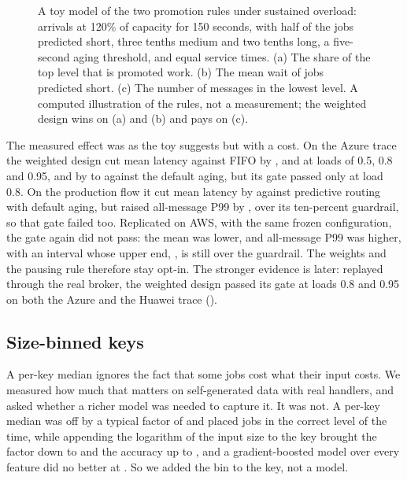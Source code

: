 \begin{figure}[t]
  \centering
  
  \caption{A toy model of the two promotion rules under sustained overload: arrivals at 120\% of capacity for 150 seconds, with half of the jobs predicted short, three tenths medium and two tenths long, a five-second aging threshold, and equal service times. (a) The share of the top level that is promoted work.
  (b) The mean wait of jobs predicted short. (c) The number of messages in the lowest level. A computed illustration of the rules, not a measurement; the weighted design wins on (a) and (b) and pays on (c).}
  \label{fig:aging}
\end{figure}

The measured effect was as the toy suggests but with a cost. On the Azure trace the weighted design cut mean latency against FIFO by \AgingSimHalfAbs{}, \AgingSimEightAbs{} and \AgingSimNinetyFiveAbs{} at loads of 0.5, 0.8 and 0.95, and by \AgingSimVsTodayHalfAbs{} to \AgingSimVsTodayNinetyFiveAbs{} against the default aging, but its gate passed only at load 0.8. On the production flow it cut mean latency by \AgingProdMeanVsPredAbs{}
against predictive routing with default aging, but raised all-message P99 by \AgingProdPNinetyNine{}, over its ten-percent guardrail, so that gate failed too. Replicated on AWS, with the same frozen configuration, the gate again did not pass: the mean was \AgingAwsMeanVsPredAbs{} lower, and all-message P99 was \AgingAwsPNinetyNine{} higher, with an interval whose upper end, \AgingAwsPNinetyNineHigh{}, is still over the guardrail. The weights and the pausing rule therefore stay opt-in. The stronger evidence is later: replayed through the real broker, the weighted design passed its gate at loads 0.8 and 0.95 on both the Azure and the Huawei trace ().

\subsection{Size-binned keys}\label{sec:sizebins}

A per-key median ignores the fact that some jobs cost what their input costs. We measured how much that matters on self-generated data with real handlers, and asked whether a richer model was needed to capture it. It was not. A per-key median was off by a typical factor of \FSPerKeyFactor{} and placed jobs in the correct level \FSPerKeyTier{} of the time, while appending the logarithm of the input size to the key
brought the factor down to \FSBinnedFactor{} and the accuracy up to \FSBinnedTier{}, and a gradient-boosted model over every feature did no better at \FSBoostTier{}. So we added the bin to the key, not a model.

